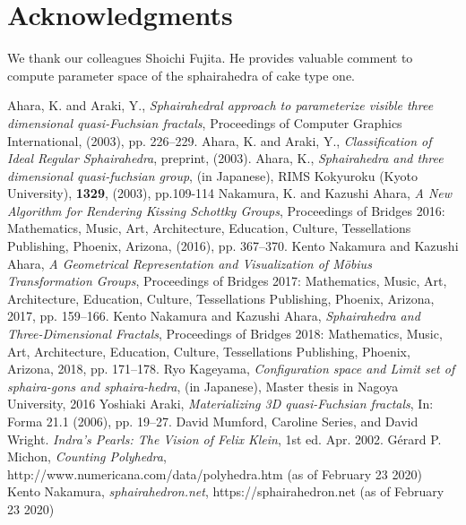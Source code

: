\documentclass[suppldata, dvipdfmx]{interact}
\theoremstyle{plain}%
\theoremstyle{definition}
\theoremstyle{remark}
\theoremstyle{problemstyle}
\begin{document}
\section{Acknowledgments}
We thank our colleagues Shoichi Fujita.
He provides valuable comment to compute parameter space of the
sphairahedra of cake type one.

\begin{thebibliography}{99}
        Ahara, K. and Araki, Y.,
        \emph{Sphairahedral approach to parameterize visible three
        dimensional quasi-Fuchsian fractals},
        Proceedings of Computer Graphics International, (2003),
        pp. 226--229.
        Ahara, K. and Araki, Y.,
        \emph{Classification of Ideal Regular Sphairahedra},
        preprint, (2003).
        Ahara, K., \emph{Sphairahedra and three dimensional quasi-fuchsian group},
        (in Japanese), RIMS Kokyuroku (Kyoto University), {\bfseries 1329}, (2003), pp.109-114
        Nakamura, K. and Kazushi Ahara,
        \emph{A New Algorithm for Rendering Kissing Schottky Groups}, 
        Proceedings of Bridges 2016: Mathematics, Music, Art, Architecture,
        Education, Culture, Tessellations Publishing,
        Phoenix, Arizona, (2016), pp. 367--370.
        Kento Nakamura and Kazushi Ahara,
        \emph{A Geometrical Representation and Visualization of M\"{o}bius Transformation Groups}, 
        Proceedings of Bridges 2017: Mathematics, Music, Art, Architecture,
        Education, Culture, Tessellations Publishing,
        Phoenix, Arizona, 2017, pp. 159--166.
        Kento Nakamura and Kazushi Ahara,
        \emph{Sphairahedra and Three-Dimensional Fractals}, 
        Proceedings of Bridges 2018: Mathematics, Music, Art, Architecture,
        Education, Culture, Tessellations Publishing,
        Phoenix, Arizona, 2018, pp. 171--178.
        Ryo Kageyama,
        \emph{Configuration space and Limit set of sphaira-gons and sphaira-hedra},
        (in Japanese), Master thesis in Nagoya University, 2016
        Yoshiaki Araki,
        \emph{Materializing 3D quasi-Fuchsian fractals},
        In: Forma 21.1 (2006), pp. 19–27.
        David Mumford, Caroline Series, and David Wright.
        \emph{Indra’s Pearls: The Vision of Felix Klein},
        1st ed. Apr. 2002.
        G\'erard P. Michon, 
        \emph{Counting Polyhedra},\\
        http://www.numericana.com/data/polyhedra.htm
        (as of February 23 2020)
        Kento Nakamura, 
        \emph{sphairahedron.net},
        https://sphairahedron.net
        (as of February 23 2020)

\end{thebibliography}
\end{document}

